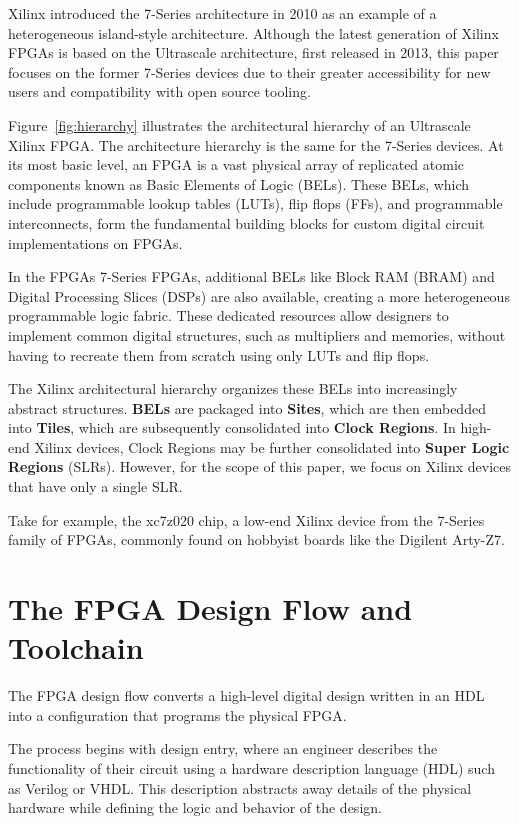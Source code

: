\documentclass[twocolumn]{article}
\begin{document}
    Xilinx introduced the 7-Series architecture in 2010 as an example of a heterogeneous island-style architecture. 
    Although the latest generation of Xilinx FPGAs is based on the Ultrascale architecture, first released in 2013, this paper focuses on the former 7-Series devices due to their greater accessibility for new users and compatibility with open source tooling.

    Figure~\ref{fig:hierarchy} illustrates the architectural hierarchy of an Ultrascale Xilinx FPGA. 
    The architecture hierarchy is the same for the 7-Series devices. 
    At its most basic level, an FPGA is a vast physical array of replicated atomic components known as Basic Elements of Logic (BELs). 
    These BELs, which include programmable lookup tables (LUTs), flip flops (FFs), and programmable interconnects, form the fundamental building blocks for custom digital circuit implementations on FPGAs. 

    In the FPGAs 7-Series FPGAs, additional BELs like Block RAM (BRAM) and Digital Processing Slices (DSPs) are also available, creating a more heterogeneous programmable logic fabric. 
    These dedicated resources allow designers to implement common digital structures, such as multipliers and memories, without having to recreate them from scratch using only LUTs and flip flops. 

    The Xilinx architectural hierarchy organizes these BELs into increasingly abstract structures. 
    \textbf{BELs} are packaged into \textbf{Sites}, which are then embedded into \textbf{Tiles}, which are subsequently consolidated into \textbf{Clock Regions}. 
    In high-end Xilinx devices, Clock Regions may be further consolidated into \textbf{Super Logic Regions} (SLRs). 
    However, for the scope of this paper, we focus on Xilinx devices that have only a single SLR. 

    Take for example, the xc7z020 chip, a low-end Xilinx device from the 7-Series family of FPGAs, commonly found on hobbyist boards like the Digilent Arty-Z7. 

\section{The FPGA Design Flow and Toolchain}
    The FPGA design flow converts a high-level digital design written in an HDL into a configuration that programs the physical FPGA. 

    The process begins with design entry, where an engineer describes the functionality of their circuit using a hardware description language (HDL) such as Verilog or VHDL. This description abstracts away details of the physical hardware while defining the logic and behavior of the design.
\end{document}
